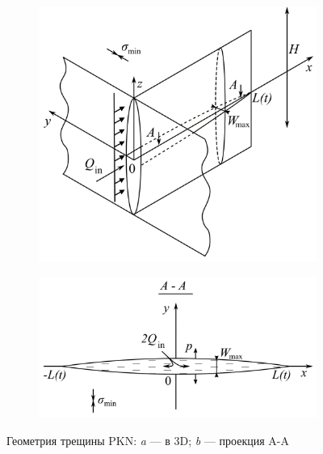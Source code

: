 \begin{figure}[H]
	\begin{subfigure}[t]{\dimexpr.5\linewidth-1.3em\relax}
		\centering
		\includegraphics[width=.95\linewidth,valign=t]{images/pkn_model_3D.jpg}
	\end{subfigure}
\hfill %
	\begin{subfigure}[t]{\dimexpr.5\linewidth-1.3em\relax}
		\centering
		\includegraphics[width=.95\linewidth,valign=t]{images/pkn_model_A-A_plane.jpg}
	\end{subfigure}
\captionsetup{justification=centering} %
\caption{Геометрия трещины PKN: {\itshape a} --- в 3D; {\itshape b} --- проекция A-A} 
\label{fig:pkn-model}
\end{figure}

